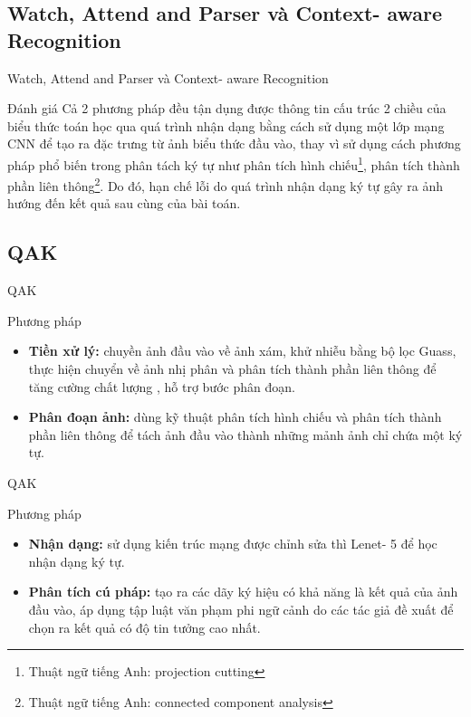 \documentclass{beamer}
\begin{document}
\subsection{Watch, Attend and Parser và Context- aware Recognition}
\begin{frame}{Watch, Attend and Parser và Context- aware Recognition}
	\begin{block}{Đánh giá}
		Cả 2 phương pháp đều tận dụng được thông tin cấu trúc 2 chiều của biểu thức toán học qua quá trình nhận dạng bằng cách sử dụng một lớp mạng CNN để tạo ra đặc trưng từ ảnh biểu thức đầu vào, thay vì sử dụng cách phương pháp phổ biến trong phân tách ký tự như phân tích hình chiếu\footnote{Thuật ngữ tiếng Anh: projection cutting}, phân tích thành phần liên thông\footnote{Thuật ngữ tiếng Anh: connected component analysis}. Do đó, hạn chế lỗi do quá trình nhận dạng ký tự gây ra ảnh hướng đến kết quả sau cùng của bài toán.
	\end{block}
\end{frame}
\subsection{QAK}
\begin{frame}{QAK}
	\begin{block}{Phương pháp}
		\begin{itemize}
			\item \textbf{Tiền xử lý:} chuyền ảnh đầu vào về ảnh xám, khử nhiễu bằng bộ lọc Guass, thực hiện chuyển về ảnh nhị phân và phân tích thành phần liên thông để tăng cường chất lượng , hỗ trợ bước phân đoạn.
			\item \textbf{Phân đoạn ảnh:} dùng kỹ thuật phân tích hình chiếu và phân tích thành phần liên thông để tách ảnh đầu vào thành những mảnh ảnh chỉ chứa một ký tự.
		\end{itemize}
	\end{block}
\end{frame}

\begin{frame}{QAK}
\begin{block}{Phương pháp}
	\begin{itemize}
		\item \textbf{Nhận dạng:} sử dụng kiến trúc mạng được chỉnh sửa thì Lenet- 5 để học nhận dạng ký tự.
		\item \textbf{Phân tích cú pháp:} tạo ra các dãy ký hiệu có khả năng là kết quả của ảnh đầu vào, áp dụng tập luật văn phạm phi ngữ cảnh do các tác giả đề xuất để chọn ra kết quả có độ tin tưởng cao nhất.
	\end{itemize}
\end{block}
\end{frame}
\end{document}
